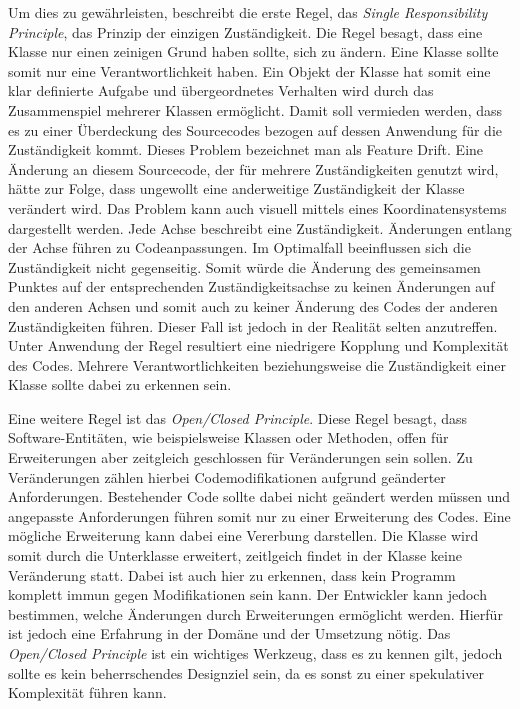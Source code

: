 Um dies zu gewährleisten, beschreibt die erste Regel, das \textit{Single Responsibility Principle}, das Prinzip der einzigen Zuständigkeit.
Die Regel besagt, dass eine Klasse nur einen zeinigen Grund haben sollte, sich zu ändern.
Eine Klasse sollte somit nur eine Verantwortlichkeit haben.
Ein Objekt der Klasse hat somit eine klar definierte Aufgabe und übergeordnetes Verhalten wird durch das Zusammenspiel mehrerer Klassen ermöglicht.
Damit soll vermieden werden, dass es zu einer Überdeckung des Sourcecodes bezogen auf dessen Anwendung für die Zuständigkeit kommt.
Dieses Problem bezeichnet man als Feature Drift.
Eine Änderung an diesem Sourcecode, der für mehrere Zuständigkeiten genutzt wird, hätte zur Folge, dass ungewollt eine anderweitige Zuständigkeit der Klasse verändert wird.
Das Problem kann auch visuell mittels eines Koordinatensystems dargestellt werden.
Jede Achse beschreibt eine Zuständigkeit.
Änderungen entlang der Achse führen zu Codeanpassungen.
Im Optimalfall beeinflussen sich die Zuständigkeit nicht gegenseitig.
Somit würde die Änderung des gemeinsamen Punktes auf der entsprechenden Zuständigkeitsachse zu keinen Änderungen auf den anderen Achsen und somit auch zu keiner Änderung des Codes der anderen Zuständigkeiten führen.
Dieser Fall ist jedoch in der Realität selten anzutreffen.
Unter Anwendung der Regel resultiert eine niedrigere Kopplung und Komplexität des Codes.
Mehrere Verantwortlichkeiten beziehungsweise die Zuständigkeit einer Klasse sollte dabei zu erkennen sein.

Eine weitere Regel ist das \textit{Open/Closed Principle}.
Diese Regel besagt, dass Software-Entitäten, wie beispielsweise Klassen oder Methoden, offen für Erweiterungen aber zeitgleich geschlossen für Veränderungen sein sollen.
Zu Veränderungen zählen hierbei Codemodifikationen aufgrund geänderter Anforderungen.
Bestehender Code sollte dabei nicht geändert werden müssen und angepasste Anforderungen führen somit nur zu einer Erweiterung des Codes.
Eine mögliche Erweiterung kann dabei eine Vererbung darstellen.
Die Klasse wird somit durch die Unterklasse erweitert, zeitlgeich findet in der Klasse keine Veränderung statt.
Dabei ist auch hier zu erkennen, dass kein Programm komplett immun gegen Modifikationen sein kann.
Der Entwickler kann jedoch bestimmen, welche Änderungen durch Erweiterungen ermöglicht werden.
Hierfür ist jedoch eine Erfahrung in der Domäne und der Umsetzung nötig.
Das \textit{Open/Closed Principle} ist ein wichtiges Werkzeug, dass es zu kennen gilt, jedoch sollte es kein beherrschendes Designziel sein, da es sonst zu einer spekulativer Komplexität führen kann.

